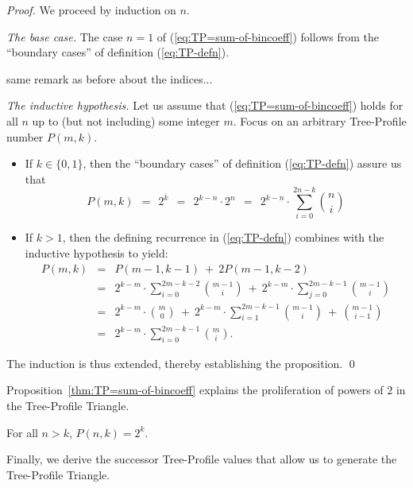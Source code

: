\begin{proof}
We proceed by induction on $n$.

\medskip

\noindent
{\it The base case.}
The case $n=1$ of (\ref{eq:TP=sum-of-bincoeff}) follows from the
``boundary cases'' of definition (\ref{eq:TP-defn}).

\medskip

{\Denis same remark as before about the indices...}

\noindent
{\it The inductive hypothesis.}
Let us assume that (\ref{eq:TP=sum-of-bincoeff}) holds for all $n$ up
to (but not including) some integer $m$.  Focus on an arbitrary
Tree-Profile number $P(m,k)$.
\begin{itemize}
\item
If $k \in \{0,1\}$, then the ``boundary cases'' of definition
(\ref{eq:TP-defn}) assure us that
\[
P(m,k) \ \ = \ \ 2^k \ \ = \ \ 2^{k-n} \cdot 2^n \ \ = \ \ 
2^{k-n} \cdot \sum_{i=0}^{2n-k} {n \choose i}
\]

\item
If $k > 1$, then the defining recurrence in (\ref{eq:TP-defn})
combines with the inductive hypothesis to yield:
\begin{eqnarray*}
\nonumber
P(m, k) & = &
   P(m-1, k-1) \ + \ 2 P(m-1, k-2) \\
        & = &
   2^{k-m} \cdot \sum_{i=0}^{2m-k-2} {m-1 \choose i}
   \ + \
   2^{k-m} \cdot \sum_{j=0}^{2m-k-1} {m-1 \choose i} \\
        & = &
   2^{k-m} \cdot {m \choose 0}
   \ + \
   2^{k-m} \cdot \sum_{i=1}^{2m-k-1} {m-1 \choose i}
   \ + \
   {{m-1} \choose {i-1}} \\
        & = &
   2^{k-m} \cdot \sum_{i=0}^{2m-k-1} {m \choose i}.
\end{eqnarray*}
\end{itemize}
The induction is thus extended, thereby establishing the proposition.
\qed
\end{proof}

Proposition~\ref{thm:TP=sum-of-bincoeff} explains the proliferation of
powers of $2$ in the Tree-Profile Triangle.

\begin{corol}
For all $n > k$, $P(n,k) = 2^k$.
\end{corol}

\medskip

Finally, we derive the successor Tree-Profile values that allow us to
generate the Tree-Profile Triangle.

